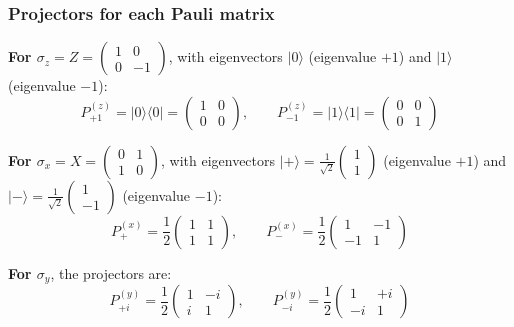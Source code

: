 \documentclass[10pt,a4paper]{article}
\begin{document}
\subsubsection*{Projectors for each Pauli matrix}

\textbf{For $\sigma_z = Z = \begin{pmatrix} 1 & 0 \\ 0 & -1 \end{pmatrix}$},
with eigenvectors $|0\rangle$ (eigenvalue $+1$) and $|1\rangle$ (eigenvalue $-1$):
\begin{equation}
    P_{+1}^{(z)} = |0\rangle\langle 0| = \begin{pmatrix} 1 & 0 \\ 0 & 0 \end{pmatrix}, \qquad
    P_{-1}^{(z)} = |1\rangle\langle 1| = \begin{pmatrix} 0 & 0 \\ 0 & 1 \end{pmatrix}
\end{equation}

\textbf{For $\sigma_x = X = \begin{pmatrix} 0 & 1 \\ 1 & 0 \end{pmatrix}$},
with eigenvectors $|{+}\rangle = \frac{1}{\sqrt{2}}\begin{pmatrix}1\\1\end{pmatrix}$ (eigenvalue $+1$)
and $|{-}\rangle = \frac{1}{\sqrt{2}}\begin{pmatrix}1\\-1\end{pmatrix}$ (eigenvalue $-1$):
\begin{equation}
    P_{+}^{(x)} = \frac{1}{2}\begin{pmatrix} 1 & 1 \\ 1 & 1 \end{pmatrix}, \qquad
    P_{-}^{(x)} = \frac{1}{2}\begin{pmatrix} 1 & -1 \\ -1 & 1 \end{pmatrix}
\end{equation}

\textbf{For $\sigma_y$}, the projectors are:
\begin{equation}
    P_{+i}^{(y)} = \frac{1}{2}\begin{pmatrix} 1 & -i \\ i & 1 \end{pmatrix}, \qquad
    P_{-i}^{(y)} = \frac{1}{2}\begin{pmatrix} 1 & +i \\ -i & 1 \end{pmatrix}
\end{equation}
\end{document}
